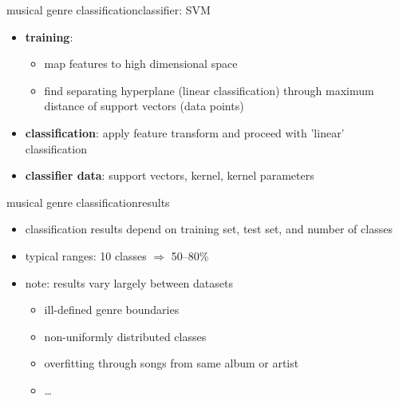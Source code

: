         \begin{frame}{musical genre classification}{classifier: SVM}
            \begin{itemize}
                \item	\textbf{training}:
                    \begin{itemize}
                        \item   map features to high dimensional space
                        \item   find separating hyperplane (linear classification) through maximum distance of support vectors (data points)
                    \end{itemize}
                \item<2->	\textbf{classification}: apply feature transform and proceed with 'linear' classification
                \item<3->	\textbf{classifier data}: support vectors, kernel, kernel parameters
            \end{itemize}
        \end{frame}

        \begin{frame}{musical genre classification}{results}
            \begin{itemize}
                \item	classification results depend on training set, test set, and number of classes
                \smallskip
                \item<2->	typical ranges: 10 classes $\Rightarrow$ 50--80\%
                \smallskip
                \item<3->	note: results vary largely between datasets
                    \begin{itemize}
                        \item   ill-defined genre boundaries
                        \item   non-uniformly distributed classes
                        \item   overfitting through songs from same album or artist
                        \item   \ldots
                    \end{itemize}
            \end{itemize}
        \end{frame}
